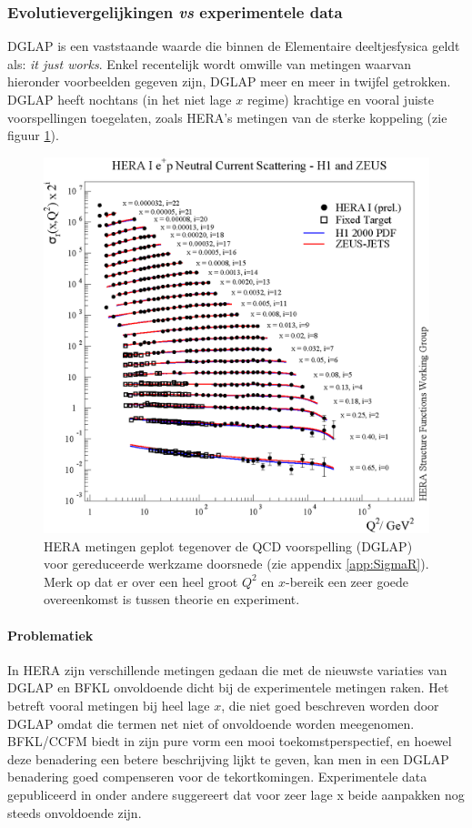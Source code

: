 \documentclass[a4paper,11pt]{article}
\numberwithin{equation}{section} %
\begin{document}
    \subsubsection{Evolutievergelijkingen \textit{vs} experimentele data} \label{sec:QCDvsExperiment}
DGLAP is een vaststaande waarde die binnen de Elementaire deeltjesfysica geldt als: \textit{it just works}.
Enkel recentelijk wordt omwille van metingen waarvan hieronder voorbeelden gegeven zijn, DGLAP meer en meer in twijfel getrokken.
DGLAP heeft nochtans (in het niet lage $x$ regime) krachtige en vooral juiste voorspellingen toegelaten, zoals HERA’s metingen van de sterke koppeling (zie figuur \ref{fig:SC}).
\begin{figure} [H]
  \begin{center}
    \includegraphics[scale=1]{Afbeeldingen/HERAF2.eps}
    \caption{HERA metingen geplot tegenover de QCD voorspelling (DGLAP) voor gereduceerde werkzame doorsnede (zie appendix \ref{app:SigmaR}). Merk op dat er over een heel groot $Q^2$ en $x$-bereik een zeer goede overeenkomst is tussen theorie en experiment. \cite{VanMechelen}}
   \label{fig:SC}
  \end{center}
\end{figure}

      \paragraph{Problematiek}
In HERA zijn verschillende metingen gedaan die met de nieuwste variaties van DGLAP en BFKL onvoldoende dicht bij de experimentele metingen raken.
Het betreft vooral metingen bij heel lage $x$, die niet goed beschreven worden door DGLAP omdat die termen net niet  of onvoldoende worden meegenomen.
BFKL/CCFM biedt in zijn pure vorm een mooi toekomstperspectief, en hoewel deze benadering een betere beschrijving lijkt te geven, kan men in een DGLAP benadering goed compenseren voor de tekortkomingen.
Experimentele data gepubliceerd in onder andere \cite{Kiesling} suggereert dat voor zeer lage x beide aanpakken nog steeds onvoldoende zijn.
\end{document}
